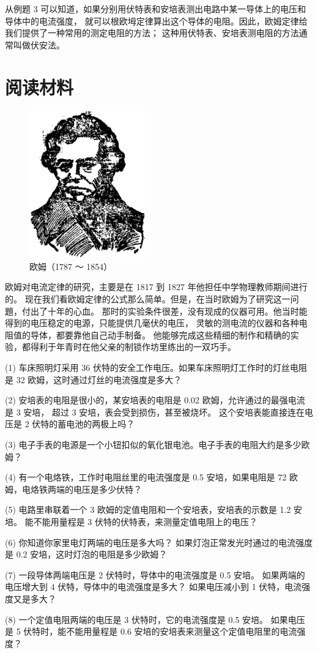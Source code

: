 从例题 3 可以知道，如果分别用伏特表和安培表测出电路中某一导体上的电压和导体中的电流强度，
就可以根欧坶定律算出这个导体的电阻。因此，欧姆定律给我们提供了一种常用的测定电阻的方法；
这种用伏特表、安培表测电阻的方法通常叫做伏安法。


\section*{阅读材料}

\begin{figure}
    \centering
    \includegraphics[width=5cm]{../pic/czwl2-ch8-ohm}
    \caption*{欧姆（1787 ～ 1854）}\label{fig:8-ohm}
\end{figure}

欧姆对电流定律的研究，主要是在 1817 到 1827 年他担任中学物理教师期间进行的。
现在我们看欧姆定律的公式那么简单。但是，在当时欧姆为了研究这一问題，付出了十年的心血。
那时的实验条件很差，没有现成的仪器可用。他当时能得到的电压稳定的电源，只能提供几毫伏的电压，
灵敏的测电流的仪器和各种电阻值的导体，都要靠他自己动手制备。
他能够完成这些精细的制作和精确的实验，都得利于年青时在他父亲的制锁作坊里练出的一双巧手。


\lianxi

(1) 车床照明灯采用 36 伏特的安全工作电压。如果车床照明灯工作时的灯丝电阻是 32 欧姆，这时通过灯丝的电流强度是多大？

(2) 安培表的电阻是很小的，某安培表的电阻是 0.02 欧姆，允许通过的最强电流是 3 安培，
超过 3 安培，表会受到损伤，甚至被烧坏。
这个安培表能直接连在电压是 2 伏特的蓄电池的两极上吗？

(3) 电子手表的电源是一个小钮扣似的氧化银电池。电子手表的电阻大约是多少欧姆？

(4) 有一个电烙铁，工作时电阻丝里的电流强度是 0.5 安培，如果电阻是 72 欧姆，电烙铁两端的电压是多少伏特？

(5) 电路里串联着一个 3 欧姆的定值电阻和一个安培表，安培表的示数是 1.2 安培。
能不能用量程是 3 伏特的伏特表，来测量定值电阻上的电压？

(6) 你知道你家里电灯两端的电压是多大吗？
如果灯泡正常发光时通过的电流强度是 0.2 安培，这时灯泡的电阻是多少欧姆？

(7) 一段导体两端电压是 2 伏特时，导体中的电流强度是 0.5 安培。
如果两端的电压增大到 4 伏特，导体中的电流强度是多大？
如果电压减小到 1 伏特，电流强度又是多大？

(8) 一个定值电阻两端的电压是 3 伏特时，它的电流强度是 0.5 安培。
如果电压是 5 伏特时，能不能用量程是 0.6 安培的安培表来测量这个定值电阻里的电流强度？

